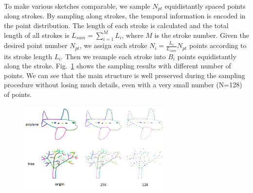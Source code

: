 \vspace{0.1cm}
To make various sketches comparable, we sample $N_{pt}$ equidistantly spaced points along strokes.
By sampling along strokes, the temporal information is encoded in the point distribution.
%
The length of each stroke is calculated and the total length of all strokes is $L_{sum}=\sum^{M}_{i=1} L_i$, where $M$ is the stroke number.
%
Given the desired point number $N_{pt}$, we assign each stroke $N_i=\frac{L_i}{L_{sum}}N_{pt}$ points according to its stroke length $L_i$.
Then we reample each stroke into $B_i$ points equidistantly along the stroke.
%
Fig.~\ref{fig:resample} shows the sampling results with different number of points.
We can see that the main structure is well preserved during the sampling procedure without losing much details, even with a very small number (N=128) of points.

\begin{figure}
	\center
	\includegraphics[width=3in]{images/resample2.png}
	\label{fig:resample}
\end{figure}



